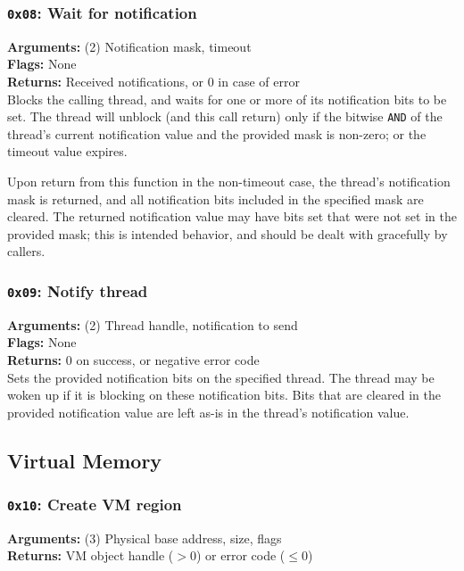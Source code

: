 \documentclass[11pt]{article}
\begin{document}
\subsubsection{{\tt 0x08}: Wait for notification}
\textbf{Arguments:} (2) Notification mask, timeout \\
\textbf{Flags:} None \\
\textbf{Returns:} Received notifications, or 0 in case of error \\

Blocks the calling thread, and waits for one or more of its notification bits to be set. The thread will unblock (and this call return) only if the bitwise \texttt{AND} of the thread's current notification value and the provided mask is non-zero; or the timeout value expires.

Upon return from this function in the non-timeout case, the thread's notification mask is returned, and all notification bits included in the specified mask are cleared. The returned notification value may have bits set that were not set in the provided mask; this is intended behavior, and should be dealt with gracefully by callers.

\subsubsection{{\tt 0x09}: Notify thread}
\textbf{Arguments:} (2) Thread handle, notification to send \\
\textbf{Flags:} None \\
\textbf{Returns:} 0 on success, or negative error code \\

Sets the provided notification bits on the specified thread. The thread may be woken up if it is blocking on these notification bits. Bits that are cleared in the provided notification value are left as-is in the thread's notification value.



\newpage
\subsection{Virtual Memory}
\subsubsection{{\tt 0x10}: Create VM region}
\textbf{Arguments:} (3) Physical base address, size, flags  \\
\textbf{Returns:} VM object handle ($>0$) or error code ($\leq0$) \\
\end{document}

